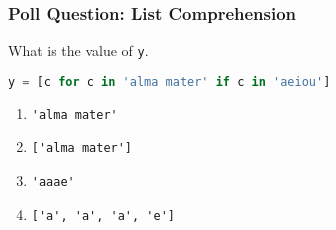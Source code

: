 \documentclass{beamer}
\begin{document}
%
%
\begin{frame}[fragile]
  \frametitle{Poll Question: List Comprehension}
  What is the value of \lstinline|y|.
  \begin{lstlisting}[language=Python, autogobble]
  y = [c for c in 'alma mater' if c in 'aeiou']
  \end{lstlisting}
  \vfill
  \begin{enumerate}[A]
    \item \lstinline|'alma mater'|
    \item \lstinline|['alma mater']|
    \item \lstinline|'aaae'|
    \item \lstinline|['a', 'a', 'a', 'e']|
  \end{enumerate}
\end{frame}
\end{document}
